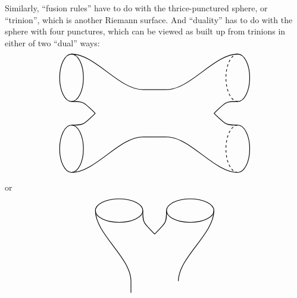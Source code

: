 \documentclass{article}
\begin{document}
\begin{enumerate}
  Similarly, ``fusion rules'' have to do with the thrice-punctured
  sphere, or ``trinion'', which is another Riemann surface. And
  ``duality'' has to do with the sphere with four punctures, which can
  be viewed as built up from trinions in either of two ``dual'' ways: \[
     \begin{tikzpicture}[scale=0.5,rotate=90]
       \begin{scope}
         \draw[thick] (-3,0) ellipse (2cm and 1cm);
         \draw[thick] (3,0) ellipse (2cm and 1cm);
         \draw[thick] (-5,0) .. controls (-5,-2) and (-2,-4) .. (-2,-6);
         \draw[thick] (5,0) .. controls (5,-2) and (2,-4) .. (2,-6);
         \draw[thick] (-1,0) .. controls (-1,-1) .. (0,-2);
         \draw[thick] (1,0) .. controls (1,-1) .. (0,-2);
         \draw[thick] (-2,-6) to (-2,-7);
         \draw[thick] (2,-6) to (2,-7);
       \end{scope}
       \begin{scope}[rotate=180,shift={(0,14)}]
         \begin{scope}[shift={(-3,0)},rotate=180]
           \draw[thick,dashed] (0:2cm and 1cm) arc (0:180:2cm and 1cm);
           \draw[thick] (180:2cm and 1cm) arc (180:360:2cm and 1cm);
         \end{scope}
         \begin{scope}[shift={(3,0)},rotate=180]
           \draw[thick,dashed] (0:2cm and 1cm) arc (0:180:2cm and 1cm);
           \draw[thick] (180:2cm and 1cm) arc (180:360:2cm and 1cm);
         \end{scope}
         \draw[thick] (-5,0) .. controls (-5,-2) and (-2,-4) .. (-2,-6);
         \draw[thick] (5,0) .. controls (5,-2) and (2,-4) .. (2,-6);
         \draw[thick] (-1,0) .. controls (-1,-1) .. (0,-2);
         \draw[thick] (1,0) .. controls (1,-1) .. (0,-2);
         \draw[thick] (-2,-6) to (-2,-7);
         \draw[thick] (2,-6) to (2,-7);
       \end{scope}
     \end{tikzpicture}
   \] or \[
     \begin{tikzpicture}[scale=0.5]
       \begin{scope}
         \draw[thick] (-3,0) ellipse (2cm and 1cm);
         \draw[thick] (3,0) ellipse (2cm and 1cm);
         \draw[thick] (-5,0) .. controls (-5,-2) and (-2,-4) .. (-2,-6);
         \draw[thick] (5,0) .. controls (5,-2) and (2,-4) .. (2,-6);
         \draw[thick] (-1,0) .. controls (-1,-1) .. (0,-2);
         \draw[thick] (1,0) .. controls (1,-1) .. (0,-2);
         \draw[thick] (-2,-6) to (-2,-7);

\end{scope}
\end{tikzpicture}\]
\end{enumerate}
\end{document}
